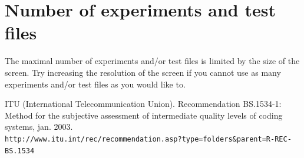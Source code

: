 \documentclass[11pt,a4paper]{book}
\begin{document}
\section{Number of experiments and test files}
The maximal number of experiments and/or test files is limited by the size of the screen. Try increasing the resolution of the screen if you cannot use as many experiments and/or test files as you would like to.

\begin{thebibliography}{WWW}
{ITU (International Telecommunication Union)}.
\newblock Recommendation {BS}.1534-1: Method for the subjective assessment of
  intermediate quality levels of coding systems, jan. 2003.\\\texttt{http://www.itu.int/rec/recommendation.asp?type=folders\&parent=R-REC-BS.1534}
\end{thebibliography}
\end{document}

